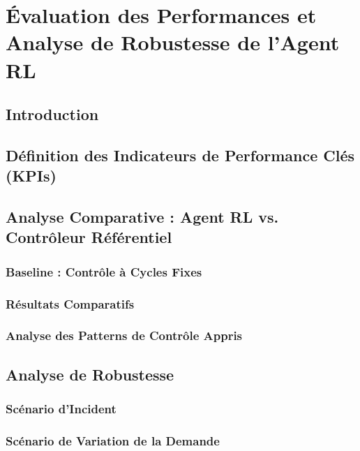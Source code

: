 \chapter{Évaluation des Performances et Analyse de Robustesse de l'Agent RL}
\label{chap:evaluation_robustesse}

\section{Introduction}

\section{Définition des Indicateurs de Performance Clés (KPIs)}

\section{Analyse Comparative : Agent RL vs. Contrôleur Référentiel}
\subsection{Baseline : Contrôle à Cycles Fixes}

\subsection{Résultats Comparatifs}

\subsection{Analyse des Patterns de Contrôle Appris}

\section{Analyse de Robustesse}
\subsection{Scénario d'Incident}

\subsection{Scénario de Variation de la Demande}

